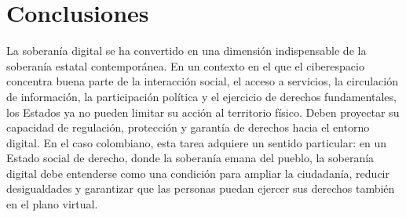 \documentclass[9pt,letterpaper,twocolumn,twoside,apabib]{rho-class/rho}
\begin{document}










	







\section{Conclusiones}
La soberanía digital se ha convertido en una dimensión indispensable de la soberanía estatal contemporánea. En un contexto en el que el ciberespacio concentra buena parte de la interacción social, el acceso a servicios, la circulación de información, la participación política y el ejercicio de derechos fundamentales, los Estados ya no pueden limitar su acción al territorio físico. Deben proyectar su capacidad de regulación, protección y garantía de derechos hacia el entorno digital. En el caso colombiano, esta tarea adquiere un sentido particular: en un Estado social de derecho, donde la soberanía emana del pueblo, la soberanía digital debe entenderse como una condición para ampliar la ciudadanía, reducir desigualdades y garantizar que las personas puedan ejercer sus derechos también en el plano virtual.
\end{document}
